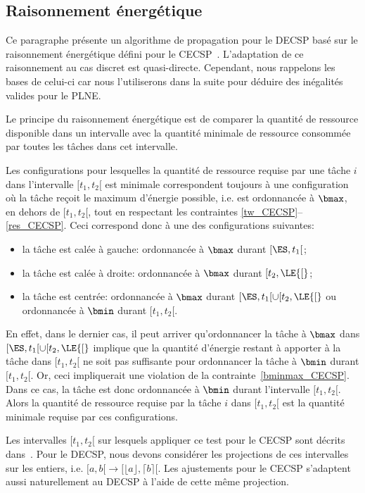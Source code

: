 \subsection{Raisonnement énergétique}


Ce paragraphe présente un algorithme de propagation pour le
DECSP basé sur le raisonnement énergétique défini pour le
CECSP~\cite{Nattaf2015}.  L'adaptation de ce raisonnement au cas
discret est quasi-directe. Cependant, nous rappelons les bases de
celui-ci car nous l'utiliserons dans la suite pour déduire des
inégalités valides pour le PLNE.

Le principe du raisonnement énergétique est de comparer la quantité de
ressource disponible dans un intervalle avec la quantité minimale de
ressource consommée par toutes les tâches dans cet intervalle.

Les configurations pour lesquelles la quantité de ressource requise
par une tâche $i$ dans l'intervalle $[t_1,t_2[$ est minimale
correspondent toujours à une configuration où la tâche reçoit le
maximum d'énergie possible, i.e. est ordonnancée à $\bmax$, en dehors
de $[t_1,t_2[$, tout en respectant les contraintes
\eqref{tw_CECSP}--\eqref{res_CECSP}. Ceci correspond donc à une des
configurations suivantes:
\begin{itemize}
\item la tâche est calée à gauche: ordonnancée à $\bmax$ durant
$[ \ES , t_1 [$;
\item la tâche est calée à droite: ordonnancée à $\bmax$ durant
$[t_2,\LE{[}$;
\item la tâche est centrée: ordonnancée à $\bmax$ durant
$[\ES,t_1[ \cup [t_2,\LE{[}$ ou ordonnancée à
$\bmin$ durant $[t_1,t_2[$.
\end{itemize} En effet, dans le dernier cas, il peut arriver
qu'ordonnancer la tâche à $\bmax$ dans $[\ES,t_1[ \cup
[t_2,\LE{[}$ implique que la quantité d'énergie restant à
apporter à la tâche dans $[t_1,t_2[$ ne soit pas suffisante pour
ordonnancer la tâche à $\bmin$ durant $[t_1,t_2[$. Or, ceci
impliquerait une violation de la
contrainte~\eqref{bminmax_CECSP}. Dans ce cas, la tâche est donc
ordonnancée à $\bmin$ durant l'intervalle $[t_1,t_2[$. Alors la
quantité de ressource requise par la tâche $i$ dans $[t_1,t_2[$ est la
quantité minimale requise par ces configurations.  

Les intervalles $[t_1,t_2[$ sur lesquels appliquer ce test pour le
CECSP sont décrits dans~\cite{Nattaf2015}. Pour le DECSP, nous devons
considérer les projections de ces intervalles sur les entiers,
i.e. $[a,b[ \rightarrow [\lfloor a \rfloor, \lceil b \rceil[$.  Les
ajustements pour le CECSP s'adaptent aussi naturellement au DECSP à
l'aide de cette même projection.

